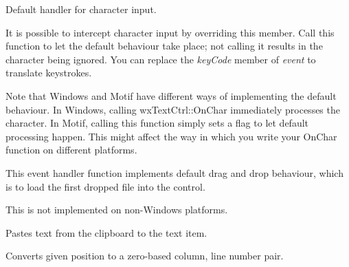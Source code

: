 
Default handler for character input.


It is possible to intercept character
input by overriding this member. Call this function
to let the default behaviour take place; not calling
it results in the character being ignored. You can
replace the {\it keyCode} member of {\it event} to
translate keystrokes.

Note that Windows and Motif have different ways
of implementing the default behaviour. In Windows,
calling wxTextCtrl::OnChar immediately
processes the character. In Motif,
calling this function simply sets a flag
to let default processing happen. This might affect
the way in which you write your OnChar function
on different platforms.



\label{wxtextctrlondropfiles}


This event handler function implements default drag and drop behaviour, which
is to load the first dropped file into the control.




This is not implemented on non-Windows platforms.



\label{wxtextctrlpaste}


Pastes text from the clipboard to the text item.

\label{wxtextctrlpositiontoxy}


Converts given position to a zero-based column, line number pair.



